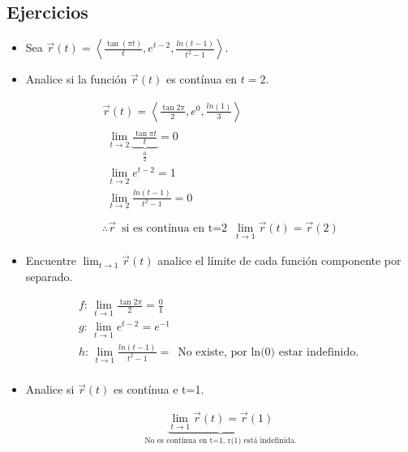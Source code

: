 \subsection{Ejercicios}
\begin{itemize}
    \item Sea $\vec{r}(t)=\left\langle \frac{\tan(\pi t)}{t} , e^{t-2}, \frac{ln(t-1)}{t^2-1}  \right\rangle $.
    \item Analice si la función $\vec{r}(t)$ es contínua en $t=2$.
        \begin{center}
            \begin{align*}
                \vec{r}(t) = \left\langle \frac{\tan 2\pi }{2}, e^0, \frac{ln(1)}{3}   \right\rangle \\ 
                \begin{matrix}
                    \lim_{t \to 2} \underbrace{\frac{\tan \pi t}{t}}_{\frac{0}{2} } = 0 \\
                    \lim_{t \to 2} e^{t-2} = 1 \\ 
                    \lim_{t \to 2} \frac{ln(t-1)}{t^2-1} = 0 \\ 
                \end{matrix} \\ 
                \therefore \vec{r} \, \text{ si es contínua en t=2   } \, \lim_{t \to 1} \vec{r}(t) = \vec{r}(2)
            \end{align*}
        \end{center}
    
    \item Encuentre $\lim_{t \to 1} \vec{r}(t)$ analice el límite de cada función componente por separado.
        \begin{center}
            \begin{align*}
                f: \, \lim_{t \to 1} \frac{\tan 2\pi }{2} = \frac{0}{1}  \\ 
                g: \, \lim_{t \to 1} e^{t-2} = e^{-1} \\ 
                h: \, \lim_{t \to 1} \frac{ln(t-1)}{t^2-1} = \, \text{  No existe, por ln(0) estar indefinido.  } \\ 
            \end{align*}
        \end{center}
    
    \item Analice si $\vec{r}(t)$ es contínua e t=1.
        \begin{center}
            \begin{align*}
                \underbrace{\lim_{t \to 1} \vec{r}(t) = \vec{r}(1) }_{\text{  No es contínua en t=1, r(1) está indefinida.  }}\\ 
            \end{align*}
        \end{center}
    

\end{itemize}
